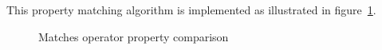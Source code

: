 This property matching algorithm is implemented as illustrated in figure~\ref{fig:implementation:matchesproperty}.

\begin{figure}[tb]
	\centering
	\def\stackalignment{r}
	\caption{Matches operator property comparison}
	\label{fig:implementation:matchesproperty}
\end{figure}

